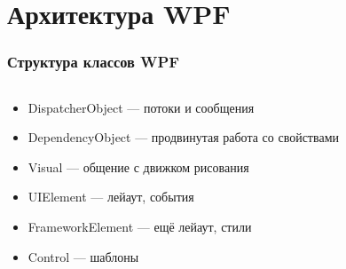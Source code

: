 \documentclass[xetex,mathserif,serif]{beamer}
\begin{document}
    \section{Архитектура WPF}

    \begin{frame}[fragile]
        \frametitle{Структура классов WPF}
        \begin{columns}
            \begin{column}{0.7\textwidth}
                \begin{itemize}
                    \item DispatcherObject --- потоки и сообщения
                    \item DependencyObject --- продвинутая работа со свойствами
                    \item Visual --- общение с движком рисования
                    \item UIElement --- лейаут, события
                    \item FrameworkElement --- ещё лейаут, стили
                    \item Control --- шаблоны
                \end{itemize}
            \end{column}
            \begin{column}{0.3\textwidth}
                \begin{center}

\end{center}
\end{column}
\end{columns}
\end{frame}
\end{document}
